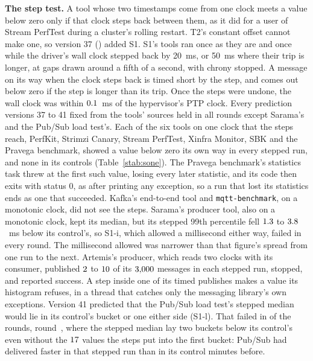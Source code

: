 \documentclass[10pt,journal,onecolumn]{IEEEtran}
\newcommand{\kafka}{Kafka}
\begin{document}
\textbf{The step test.} A tool whose two timestamps come from one clock meets a value below zero
only if that clock steps back between them, as it did for a user of Stream PerfTest during a
cluster's rolling restart. T2's constant offset cannot make one, so version 37
() added S1. S1's tools ran once as they are and once while the
driver's wall clock stepped back by 20~ms, or 50~ms where their trip is longer, at gaps drawn around
a fifth of a second, with chrony stopped. A message on its way when the clock steps back is timed
short by the step, and comes out below zero if the step is longer than its trip. Once the steps were
undone, the wall clock was within $0.1$~ms of the hypervisor's PTP clock. Every
prediction versions 37 to 41 fixed from the tools' sources held in all \sOneRoundsWord{} rounds
except Sarama's and the Pub/Sub load test's. Each of the six tools on one clock that the steps
reach, PerfKit, Strimzi Canary, Stream PerfTest, Xinfra Monitor, SBK and the Pravega benchmark,
showed a value below zero its own way in every stepped run, and none in its controls
(Table~\ref{stab:sone}). The Pravega benchmark's statistics task threw at the first such value,
losing every later statistic, and its code then exits with status 0, as after printing any
exception, so a run that lost its statistics ends as one that succeeded. \kafka{}'s end-to-end tool
and \texttt{mqtt-benchmark}, on a monotonic clock, did not see the steps. Sarama's producer tool,
also on a monotonic clock, kept its median, but its stepped 99th percentile fell $1.3$
to $3.8$~ms below its control's, so S1-i, which allowed a millisecond either way,
failed in every round. The millisecond allowed was narrower than that figure's spread from one run
to the next. Artemis's producer, which reads two clocks with its consumer, published
$2$ to $10$ of its $3{,}000$ messages in each stepped run,
stopped, and reported success. A step inside one of its timed publishes makes a value its histogram
refuses, in a thread that catches only the messaging library's own exceptions. Version 41
predicted that the Pub/Sub load test's stepped median would lie in its control's bucket or one
either side (S1-l). That failed in \sOnePubsubFailedWord{} of the \sOneRoundsWord{} rounds,
round~\sOnePubsubFailedRound{}, where the stepped median lay two buckets below its control's even
without the $17$ values the steps put into the first bucket: Pub/Sub had delivered
faster in that stepped run than in its control minutes before.
\end{document}
